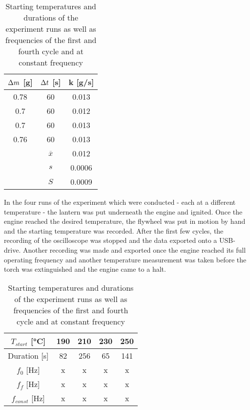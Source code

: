 \documentclass[titlepage]{article}
\begin{document}
\begin{table}[h]
    \centering
    \begin{tabular}{|c|c|c|}
        \hline
        \(\adif m\) [g] & \(\adif t\) [s] & k [g/s]
        \\
        \hline
        0.78 & 60 & 0.013
        \\
        \hline
        0.7 & 60 & 0.012
        \\
        \hline
        0.7 & 60 & 0.013
        \\
        \hline
        0.76 & 60 & 0.013
        \\
        \hline
        \hline
        & \(\overline{x}\) & 0.012
        \\
        \hline
        & \(s\) & 0.0006
        \\
        \hline
        & \(S\) & 0.0009
        \\
        \hline
    \end{tabular}
    \caption{Starting temperatures and durations of the experiment runs as well as frequencies of the first and fourth cycle and at constant frequency}
    \label{tb_consumption_rate}
\end{table}

In the four runs of the experiment which were conducted - each at a different temperature - the lantern was put underneath the engine and ignited. Once the engine reached the desired temperature, the flywheel was put in motion by hand and the starting temperature was recorded. After the first few cycles, the recording of the oscilloscope was stopped and the data exported onto a USB-drive. Another recording was made and exported once the engine reached its full operating frequency and another temperature measurement was taken before the torch was extinguished and the engine came to a halt.

\begin{table}[h]
    \centering
    \begin{tabular}{|c||c|c|c|c|}
        \hline
        \(T_{start}\) [°C] & \textbf{190} & \textbf{210} & \textbf{230} & \textbf{250}
        \\
        \hline
        Duration [s] & 82 & 256 & 65 & 141
        \\
        \hline
        \(f_0\) [Hz] & x & x & x & x
        \\
        \hline
        \(f_f\) [Hz] & x & x & x & x
        \\
        \hline
        \(f_{const}\) [Hz] & x & x & x & x
        \\
        \hline
    \end{tabular}
    \caption{Starting temperatures and durations of the experiment runs as well as frequencies of the first and fourth cycle and at constant frequency}
    \label{tb_efficiency_runs}
\end{table}



\end{document}
